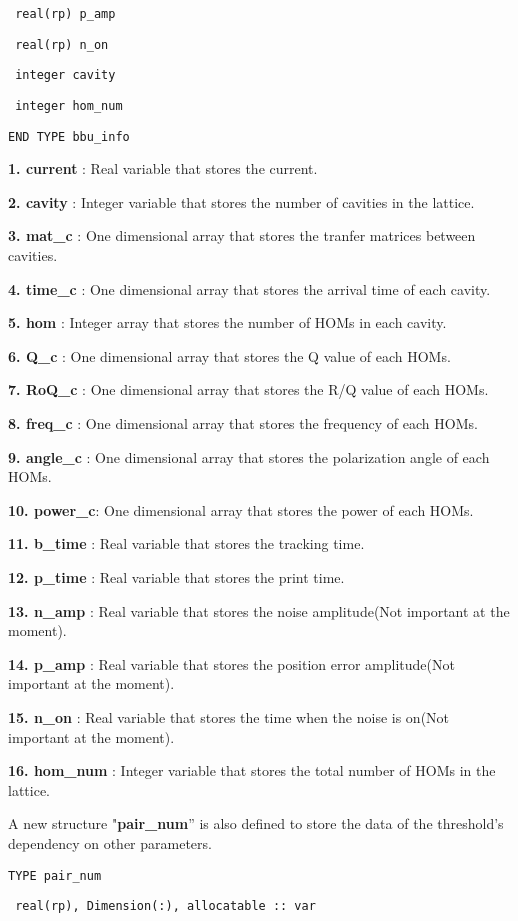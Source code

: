 \documentclass[12pt]{article}
\begin{document}
\texttt{  real(rp)  p\_amp}

\texttt{  real(rp)  n\_on}

\texttt{  integer   cavity}

\texttt{  integer   hom\_num}

\texttt{END TYPE bbu\_info}

{\bf 1. current} : Real variable that stores the current.

{\bf 2. cavity}  : Integer variable that stores the number of cavities in the lattice.

{\bf 3. mat\_c}   : One dimensional array that stores the tranfer matrices between cavities.

{\bf 4. time\_c}  : One dimensional array that stores the arrival time of each cavity.

{\bf 5. hom}     : Integer array that stores the number of HOMs in each cavity.


{\bf 6. Q\_c}     : One dimensional array that stores the Q value of each HOMs.


{\bf 7. RoQ\_c}   : One dimensional array that stores the R/Q value of each HOMs.

{\bf 8. freq\_c}  : One dimensional array that stores the frequency of each HOMs.

{\bf 9. angle\_c} : One dimensional array that stores the polarization angle of each HOMs.

{\bf 10. power\_c}: One dimensional array that stores the power of each HOMs.

{\bf 11. b\_time} : Real variable that stores the tracking time.

{\bf 12. p\_time} : Real variable that stores the print time.

{\bf 13. n\_amp}  : Real variable that stores the noise amplitude(Not important at the moment).

{\bf 14. p\_amp}  : Real variable that stores the position error amplitude(Not important at the moment).

{\bf 15. n\_on}   : Real variable that stores the time when the noise is on(Not important at the moment).

{\bf 16. hom\_num} : Integer variable that stores the total number of HOMs in the lattice.

A new structure "{\bf pair\_num}'' is also defined to store the data of the threshold's dependency on other parameters.

\texttt{TYPE pair\_num}

\texttt{  real(rp), Dimension(:), allocatable ::  var}
\end{document}
